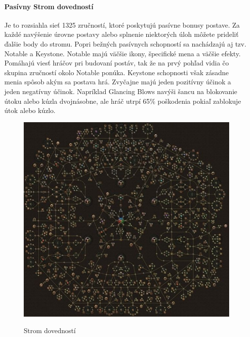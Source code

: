 \documentclass[10pt,oneside,slovak,a4paper]{article}
\begin{document}
\paragraph{Pasívny Strom dovedností}
Je to rozsiahla sieť 1325 zručností, ktoré poskytujú pasívne bonusy postave. Za každé navýšenie úrovne postavy alebo splnenie niektorých úloh môžete prideliť ďalšie body do stromu. Popri bežných pasívnych schopností sa nachádzajú aj tzv. Notable a Keystone. Notable majú väčšie ikony, špecifické mena a väčšie efekty. Pomáhajú viesť hráčov pri budovaní postáv, tak že na prvý pohľad vidia čo skupina zručností okolo Notable ponúka. Keystone schopnosti však zásadne menia spôsob akým sa postava hrá. Zvyčajne majú jeden pozitívny účinok a jeden negatívny účinok. Napríklad Glancing Blows navýši šancu na blokovanie útoku alebo kúzla dvojnásobne, ale hráč utrpí 65\% poškodenia pokiaľ zablokuje útok alebo kúzlo.
\begin{figure}[tbh]
\centering
\includegraphics[scale=0.5,]{Path-of-exile-skill-tree.jpg}
\caption{Strom dovedností}\cite{PoE-skilltree}
\label{f:Strom dovedností}
\end{figure}


\end{document}

